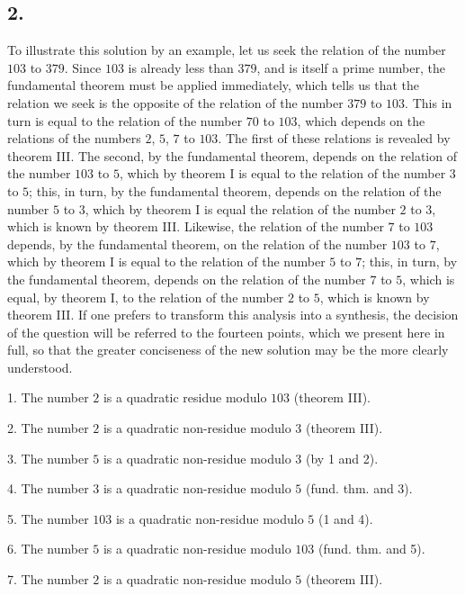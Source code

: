 \documentclass[twoside,12pt]{memoir}
\begin{document}
\subsection*{2.}

To illustrate this solution by an example, let us seek the relation of the number \(103\) to \(379\). Since \(103\) is already less than \(379\), and is itself a prime number, the fundamental theorem must be applied immediately, which tells us that the relation we seek is the opposite of the relation of the number \(379\) to \(103\). This in turn is equal to the relation of the number \(70\) to \(103\), which depends on the relations of the numbers \(2\), \(5\), \(7\) to \(103\). The first of these relations is revealed by theorem III. The second, by the fundamental theorem, depends on the relation of the number \(103\) to \(5\), which by theorem I is equal to the relation of the number \(3\) to \(5\); this, in turn, by the fundamental theorem, depends on the relation of the number \(5\) to \(3\), which by theorem I is equal the relation of the number \(2\) to \(3\), which is known by theorem III. Likewise, the relation of the number \(7\) to \(103\) depends, by the fundamental theorem, on the relation of the number \(103\) to \(7\), which by theorem I is equal to the relation of the number \(5\) to \(7\); this, in turn, by the fundamental theorem, depends on the relation of the number \(7\) to \(5\), which is equal, by theorem I, to the relation of the number \(2\) to \(5\), which is known by theorem III. If one prefers to transform this analysis into a synthesis, the decision of the question will be referred to the fourteen points, which we present here in full, so that the greater conciseness of the new solution may be the more clearly understood.

1. The number \(2\) is a quadratic residue modulo \(103\) (theorem III).
    
2. The number \(2\) is a quadratic non-residue modulo \(3\) (theorem III).
    
3. The number \(5\) is a quadratic non-residue modulo \(3\) (by 1 and 2).
    
4. The number \(3\) is a quadratic non-residue modulo \(5\) (fund{.} thm{.} and 3).
    
5. The number \(103\) is a quadratic non-residue modulo \(5\) (1 and 4).\pagebreak%
    
6. The number \(5\) is a quadratic non-residue modulo \(103\) (fund{.} thm{.} and 5).
    
7. The number \(2\) is a quadratic non-residue modulo \(5\) (theorem III).
    
\end{document}
